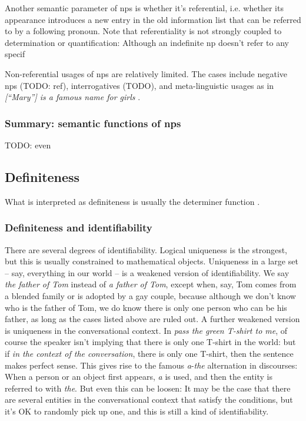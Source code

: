 \documentclass[UTF8, a4paper, oneside, scheme=plain]{ctexrep}
\newcommand*{\citepage}[1]{pp.~{#1}}
\newcommand{\corpus}[1]{\emph{#1}}
\begin{document}
Another semantic parameter of \acs{np}s is whether it's referential,
i.e. whether its appearance introduces a new entry in the old information list 
that can be referred to by a following pronoun.
Note that referentiality is not strongly coupled to determination or quantification:
Although an indefinite \acs{np} doesn't refer to any specif

Non-referential usages of \acs{np}s are relatively limited.
The cases include negative \acs{np}s (TODO: ref), 
interrogatives (TODO), 
and meta-linguistic usages as in \corpus{[``Mary''] is a famous name for girls}
\citep[\citepage{400}]{cgel}.

\subsubsection{Summary: semantic functions of \acs{np}s}

TODO: even

\subsection{Definiteness}\label{sec:semantic.definite}

What is interpreted as definiteness
is usually the determiner function .

\subsubsection{Definiteness and identifiability}\label{sec:np.semantic.identify}



There are several degrees of identifiability.
Logical uniqueness is the strongest, 
but this is usually constrained to mathematical objects.
Uniqueness in a large set -- say, everything in our world -- 
is a weakened version of identifiability.
We say \corpus{the father of Tom}
instead of \corpus{a father of Tom},
except when, say, Tom comes from a blended family or is adopted by a gay couple,
because although we don't know who is the father of Tom,
we do know there is only one person who can be his father,
as long as the cases listed above are ruled out.
A further weakened version is uniqueness in the conversational context.
In \corpus{pass the green T-shirt to me}, 
of course the speaker isn't implying that there is only one T-shirt in the world:
but if \emph{in the context of the conversation},
there is only one T-shirt,
then the sentence makes perfect sense.
This gives rise to the famous \corpus{a}-\corpus{the} alternation in discourses:
When a person or an object first appears,
\corpus{a} is used,
and then the entity is referred to with \corpus{the}.
But even this can be loosen:
It may be the case that there are several entities in the conversational context
that satisfy the conditions,
but it's OK to randomly pick up one,
and this is still a kind of identifiability.
\end{document}
